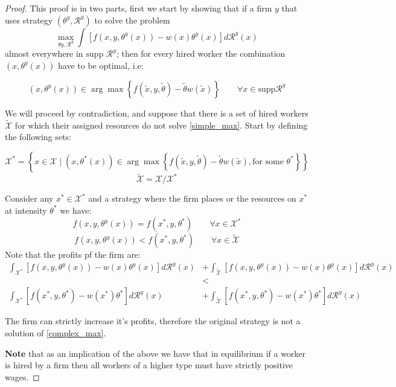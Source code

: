 \documentclass[12pt]{article}
\theoremstyle{definition}
\begin{document}
\begin{proof}
This proof is in two parts, first we start by showing that if a firm $y$ that uses strategy $(\theta^y, \mathcal{R}^y)$ to solve the problem 
\begin{equation}\label{complex_max}
\max _{\theta y, \mathcal{R}^{y}} \int\left[f\left(x, y, \theta^{y}(x)\right)-w(x) \theta^{y}(x)\right] d \mathcal{R}^{y}(x)
\end{equation}
almost everywhere in $\text{supp } \mathcal{R}^y$; then for every hired worker the combination $(x,\theta^y(x))$ have to be optimal, i.e:

\begin{equation}\label{simple_max}
(x,\theta^y(x)) \in \arg\max \left\{ f(\tilde{x}, y, \tilde{\theta})-\tilde{\theta} w(\tilde{x}) \right \} \qquad \forall x\in \text{supp}\mathcal{R}^y
\end{equation}

We will proceed by contradiction, and suppose that there is a set of hired workers $\tilde{\mathcal{X}}$ for which their assigned resources do not solve \eqref{simple_max}. Start by defining the following sets:

$$\mathcal{X}^*=\left\{x\in \mathcal{X}\mid (x,\theta^*(x)) \in \arg\max \left\{ f(\tilde{x}, y, \tilde{\theta})-\tilde{\theta} w(\tilde{x}) , \text{for some } \theta^*\right \} \right\}$$ $$\tilde{\mathcal{X}} = \mathcal{X} / \mathcal{X}^*$$

Consider any $x^* \in \mathcal{X}^*$ and a strategy where the firm places or the resources on $x^*$ at intensity $\theta^*$ we have:
$$f(x,y,\theta^y(x)) = f(x^*, y, \theta^*) \qquad \forall x\in \mathcal{X}^*$$
$$f(x,y,\theta^y(x)) < f(x^*, y, \theta^*) \qquad \forall x\in \tilde{\mathcal{X}}$$
Note that the profits pf the firm are:
\begin{align*}
\int_{\mathcal{X}^*}\left[f(x,y,\theta^y(x)) - w(x)\theta^y(x)\right]d\mathcal{R}^y(x) &+ \int_{\tilde{\mathcal{X}}}\left[f(x,y,\theta^y(x)) - w(x)\theta^y(x)\right]d\mathcal{R}^y(x)\\
&<\\
\int_{\mathcal{X}^*}\left[f(x^*,y,\theta^*) - w(x^*)\theta^*\right]d\mathcal{R}^y(x) &+ \int_{\tilde{\mathcal{X}}}\left[f(x^*,y,\theta^*) - w(x^*)\theta^*\right]d\mathcal{R}^y(x)
\end{align*}

The firm can strictly increase it's profits, therefore the original strategy is not a solution of \eqref{complex_max}.

\textbf{Note} that as an implication of the above we have that in equilibrium if a worker is hired by a firm then all workers of a higher type must have strictly positive wages.


\end{proof}
\end{document}
